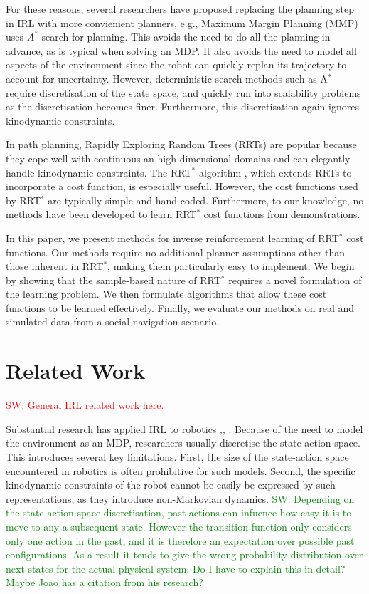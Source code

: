 \documentclass{article}  %
\newcommand{\sw}[1]{\textcolor{red}{SW: #1}}
\newcommand{\ks}[1]{\textcolor{green}{SW: #1}}
\begin{document}
For these reasons, several researchers have proposed replacing the planning step in IRL with more convienient planners, e.g., Maximum Margin Planning (MMP) \cite{ratliff2006maximum} uses $A^*$ search for planning. This avoids the need to do all the planning in advance, as is typical when solving an MDP. It also avoids the need to model all aspects of the environment since the robot can quickly replan its trajectory to account for uncertainty. However, deterministic search methods such as A$^*$ require discretisation of the state space, and quickly run into scalability problems as the discretisation becomes finer. Furthermore, this discretisation again ignores kinodynamic constraints.

In path planning, Rapidly Exploring Random Trees (RRTs) \cite{lavalle1998rapidly} are popular because they cope well with continuous an high-dimensional domains and can elegantly handle kinodynamic constraints. The RRT$^*$ algorithm \cite{karaman2011sampling}, which extends RRTs to incorporate a cost function, is especially useful. However, the cost functions used by RRT$^*$ are typically simple and hand-coded.  Furthermore, to our knowledge, no methods have been developed to learn RRT$^*$ cost functions from demonstrations.

In this paper, we present methods for inverse reinforcement learning of RRT$^*$ cost functions. Our methods require no additional planner assumptions other than those inherent in RRT$^*$, making them particularly easy to implement. We begin by showing that the sample-based nature of RRT$^*$ requires a novel formulation of the learning problem. We then formulate algorithms that allow these cost functions to be learned effectively. Finally, we evaluate our methods on real and simulated data from a social navigation scenario. 

\section{Related Work}

\sw{General IRL related work here.}

Substantial research has applied IRL to robotics \cite{henry2010learning},\cite{abbeel2008apprenticeship}, \cite{vasquez2014inverse}. Because of the need to model the environment as an MDP, researchers usually discretise the state-action space. This introduces several key limitations. First, the size of the state-action space encountered in robotics is often prohibitive for such models. Second, the specific kinodynamic constraints of the robot cannot be easily be expressed by such representations, as they introduce non-Markovian dynamics. \ks{Depending on the state-action space discretisation, past actions can infuence how easy it is to move to any a subsequent state. However the transition function only considers only one action in the past, and it is therefore an expectation over possible past configurations. As a result it tends to give the wrong probability distribution over next states for the actual physical system. Do I have to explain this in detail? Maybe Joao has a citation from his research?}
\end{document}
